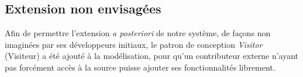 \documentclass[11pt]{article}
\begin{document}
\subsection{Extension non envisagées}
\label{sec-4-5}
Afin de permettre l'extension \emph{a posteriori} de notre système, de façons non imaginées par ses développeurs initiaux, le patron de conception \emph{Visitor} (Visiteur) a été ajouté à la modélisation, pour qu'un contributeur externe n'ayant pas forcément accès à la source puisse ajouter ses fonctionnalités librement.
\end{document}
